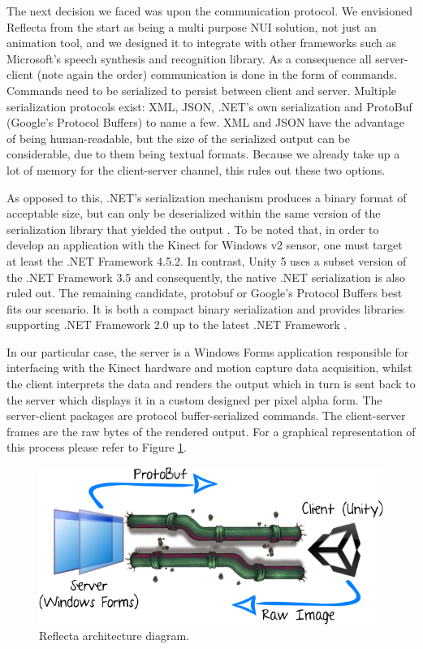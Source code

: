 \documentclass[a4paper, 12pt]{amsart}
\begin{document}
The next decision we faced was upon the communication protocol. We envisioned Reflecta from the start as being a multi purpose NUI solution, not just an animation tool, and we designed it to integrate with other frameworks such as Microsoft's speech synthesis and recognition library. As a consequence all server-client (note again the order) communication is done in the form of commands. Commands need to be serialized to persist between client and server. Multiple serialization protocols exist: XML, JSON, .NET's own serialization and ProtoBuf (Google's Protocol Buffers) to name a few. XML and JSON have the advantage of being human-readable, but the size of the serialized output can be considerable, due to them being textual formats. Because we already take up a lot of memory for the client-server channel, this rules out these two options. 

As opposed to this, .NET's serialization mechanism produces a binary format of acceptable size, but can only be deserialized within the same version of the serialization library that yielded the output \cite{bib_msdn}. To be noted that, in order to develop an application with the Kinect for Windows v2 sensor, one must target at least the .NET Framework 4.5.2. In contrast, Unity 5 uses a subset version of the .NET Framework 3.5 and consequently, the native .NET serialization is also ruled out. The remaining candidate, protobuf or Google's Protocol Buffers best fits our scenario. It is both a compact binary serialization and provides libraries supporting .NET Framework 2.0 up to the latest .NET Framework \cite{bib_google_protocol_buffers}.

In our particular case, the server is a Windows Forms application responsible for interfacing with the Kinect hardware and motion capture data acquisition, whilst the client interprets the data and renders the output which in turn is sent back to the server which displays it in a custom designed per pixel alpha form. The server-client packages are protocol buffer-serialized commands. The client-server frames are the raw bytes of the rendered output. For a graphical representation of this process please refer to Figure \ref{fig:reflecta_architecture}.

\begin{figure}[htb]
\centering
\includegraphics[width=.9\linewidth]{fig_reflecta_architecture}
\caption{Reflecta architecture diagram.}
\label{fig:reflecta_architecture}
\end{figure}
\end{document}
